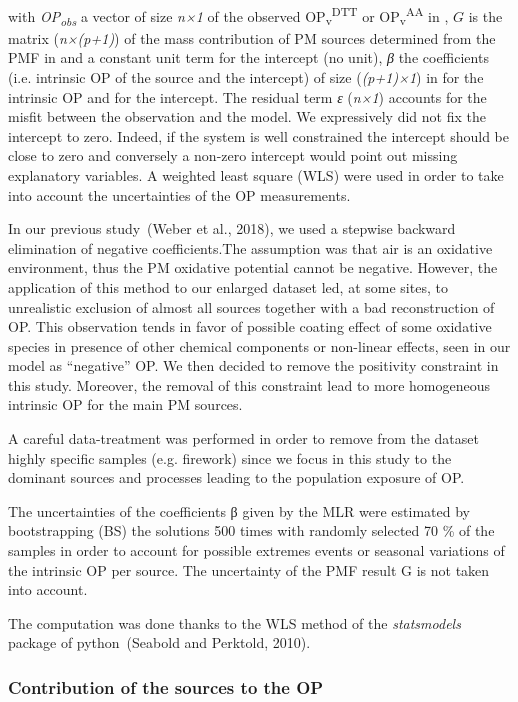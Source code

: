 \documentclass[
]{article}
\begin{document}
with \emph{OP\textsubscript{obs}} a vector of size \emph{n×1} of the
observed OP\textsubscript{v}\textsuperscript{DTT} or
OP\textsubscript{v}\textsuperscript{AA} in , \(G\) is the matrix
(\emph{n×(p+1)}) of the mass contribution of PM sources determined from
the PMF in and a constant unit term for the intercept (no unit),
\emph{β} the coefficients (i.e. intrinsic OP of the source and the
intercept) of size (\emph{(p+1)×1}) in for the intrinsic OP and for the
intercept. The residual term \emph{ε} (\emph{n×1}) accounts for the
misfit between the observation and the model. We expressively did not
fix the intercept to zero. Indeed, if the system is well constrained the
intercept should be close to zero and conversely a non-zero intercept
would point out missing explanatory variables. A weighted least square
(WLS) were used in order to take into account the uncertainties of the
OP measurements.

In our previous study~(Weber et al., 2018), we used a stepwise backward
elimination of negative coefficients.The assumption was that air is an
oxidative environment, thus the PM oxidative potential cannot be
negative. However, the application of this method to our enlarged
dataset led, at some sites, to unrealistic exclusion of almost all
sources together with a bad reconstruction of OP. This observation tends
in favor of possible coating effect of some oxidative species in
presence of other chemical components or non-linear effects, seen in our
model as ``negative'' OP. We then decided to remove the positivity
constraint in this study. Moreover, the removal of this constraint lead
to more homogeneous intrinsic OP for the main PM sources.

A careful data-treatment was performed in order to remove from the
dataset highly specific samples (e.g. firework) since we focus in this
study to the dominant sources and processes leading to the population
exposure of OP.

The uncertainties of the coefficients β given by the MLR were estimated
by bootstrapping (BS) the solutions 500 times with randomly selected 70
\% of the samples in order to account for possible extremes events or
seasonal variations of the intrinsic OP per source. The uncertainty of
the PMF result G is not taken into account.

The computation was done thanks to the WLS method of the
\emph{statsmodels} package of python~(Seabold and Perktold, 2010).

\hypertarget{contribution-of-the-sources-to-the-op}{%
\subsubsection{Contribution of the sources to the
OP}\label{contribution-of-the-sources-to-the-op}}
\end{document}
